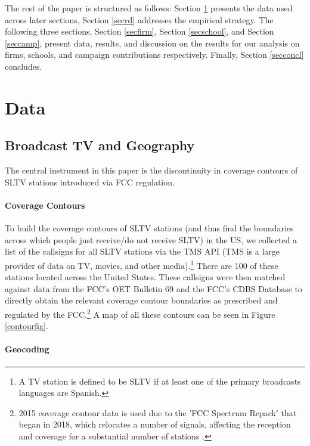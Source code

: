 \documentclass[11pt]{article}
\begin{document}
The rest of the paper is structured as follows: Section \ref{secdata} presents the data used across later sections, Section \ref{secrd} addresses the empirical strategy. The following three sections, Section \ref{secfirm}, Section \ref{secschool}, and Section \ref{seccamp}, present data, results, and discussion on the results for our analysis on firms, schools, and campaign contributions respectively. Finally, Section \ref{secconcl} concludes.


\section{Data}\label{secdata}


\subsection{Broadcast TV and Geography}

The central instrument in this paper is the discontinuity in coverage contours of SLTV stations introduced via FCC regulation.

\paragraph{Coverage Contours} 

To build the coverage contours of SLTV stations (and thus find the boundaries across which people just receive/do not receive SLTV) in the US, we collected a list of the callsigns for all SLTV stations via the TMS API (TMS is a large provider of data on TV, movies, and other media).\footnote{ A TV station is defined to be SLTV if at least one of the primary broadcasts languages are Spanish.} There are 100 of these stations located across the United States. These callsigns were then matched against data from the FCC's OET Bulletin 69 and the FCC's CDBS Database to directly obtain the relevant coverage contour boundaries as prescribed and regulated by the FCC.\footnote{ 2015 coverage contour data is used due to the 'FCC Spectrum Repack' that began in 2018, which relocates a number of signals, affecting the reception and coverage for a substantial number of stations \citep{fletcher_fcc_2018}.} 
A map of all these contours can be seen in Figure \ref{contourfig}.

\paragraph{Geocoding}
\end{document}

